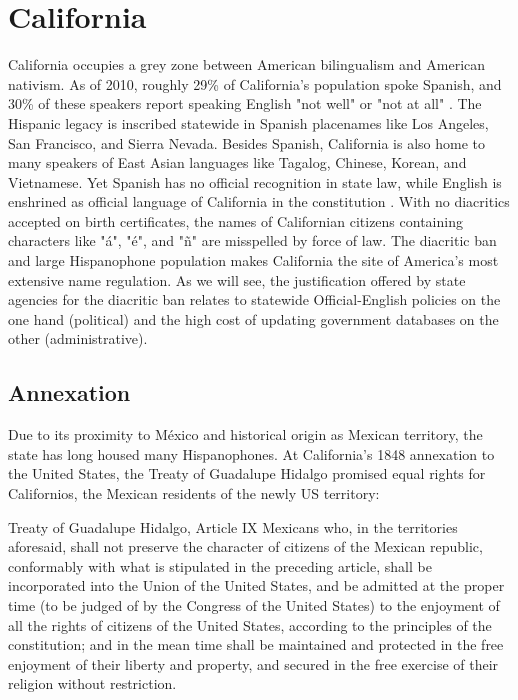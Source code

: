 \section{California}

California occupies a grey zone between American bilingualism and American
nativism. As of 2010, roughly 29\% of California's population spoke Spanish, and
30\% of these speakers report speaking English "not well" or "not at all"
\parencite{acs-lang-states}. The Hispanic legacy is inscribed statewide in
Spanish placenames like Los Angeles, San Francisco, and Sierra Nevada. Besides
Spanish, California is also home to many speakers of East Asian languages like
Tagalog, Chinese, Korean, and Vietnamese. Yet Spanish has no official
recognition in state law, while English is enshrined as official language of
California in the constitution \parencite{ca-const}. With no diacritics accepted
on birth certificates, the names of Californian citizens containing characters
like "á", "é", and "ñ" are misspelled by force of law. The diacritic ban and
large Hispanophone population makes California the site of America's most
extensive name regulation. As we will see, the justification offered by state
agencies for the diacritic ban relates to statewide Official-English policies on
the one hand (political) and the high cost of updating government databases on
the other (administrative).

\subsection{Annexation}

Due to its proximity to México and historical origin as Mexican territory, the
state has long housed many Hispanophones. At California's 1848 annexation to the
United States, the Treaty of Guadalupe Hidalgo promised equal rights for
Californios, the Mexican residents of the newly US territory:

\begin{aquote}{Treaty of Guadalupe Hidalgo, Article IX}
	Mexicans who, in the territories aforesaid, shall not preserve the character
	of citizens of the Mexican republic, conformably with what is stipulated in
	the preceding article, shall be incorporated into the Union of the United
	States, and be admitted at the proper time (to be judged of by the Congress of
	the United States) to the enjoyment of all the rights of citizens of the
	United States, according to the principles of the constitution; and in the
	mean time shall be maintained and protected in the free enjoyment of their
	liberty and property, and secured in the free exercise of their religion
	without restriction. \parencite{guadalupe}
\end{aquote}

